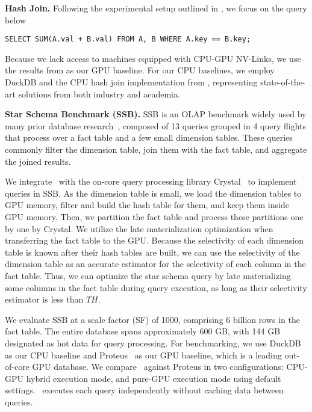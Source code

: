 \noindent
\textbf{Hash Join.}
Following the experimental setup outlined in \cite{triton-join}, we focus on the query below
\begin{verbatim}
SELECT SUM(A.val + B.val) FROM A, B WHERE A.key == B.key;
\end{verbatim}
Because we lack access to machines equipped with CPU-GPU NV-Links, we use the results from \cite{triton-join} as our GPU baseline. 
For our CPU baselines, we employ DuckDB and the CPU hash join implementation from \cite{triton-join}, representing state-of-the-art solutions from both industry and academia.

\noindent
\textbf{Star Schema Benchmark (SSB).}
SSB is an OLAP benchmark widely used by many prior database research~\cite{ydb-2013, crystal-sigmod-20, mordered-vldb-2022, kaibo-vldb-2014, hetexchange-vldb-2019}, composed of 13 queries grouped in 4 query flights that process over a fact table and a few small dimension tables.
These queries commonly filter the dimension table, join them with the fact table, and aggregate the joined results. 

We integrate \THISWORK\ with the on-core query processing library Crystal~\cite{crystal-sigmod-20} to implement queries in SSB.
As the dimension table is small, we load the dimension tables to GPU memory, filter and build the hash table for them, and keep them inside GPU memory.
Then, we partition the fact table and process these partitions one by one by Crystal.
We utilize the late materialization optimization when transferring the fact table to the GPU.
Because the selectivity of each dimension table is known after their hash tables are built, we can use the selectivity of the dimension table as an accurate estimator for the selectivity of each column in the fact table.
Thus, we can optimize the star schema query by late materializing some columns in the fact table during query execution, as long as their selectivity estimator is less than $TH$.

{\color{blue}


}



We evaluate SSB at a scale factor (SF) of 1000, comprising 6 billion rows in the fact table. 
The entire database spans approximately 600 GB, with 144 GB designated as hot data for query processing. 
For benchmarking, we use DuckDB as our CPU baseline and Proteus~\cite{hetexchange-vldb-2019} as our GPU baseline, which is a leading out-of-core GPU database. 
We compare \THISWORK\ against Proteus in two configurations: CPU-GPU hybrid execution mode, and pure-GPU execution mode using default settings.
\THISWORK\ executes each query independently without caching data between queries.


